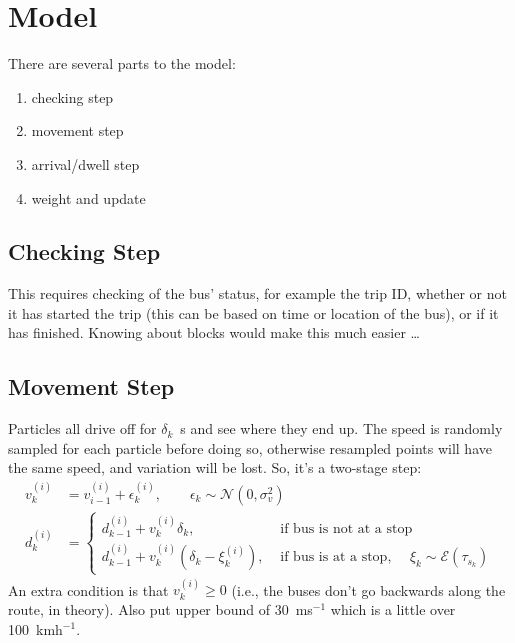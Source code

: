 \documentclass[10pt,a4paper]{article}
\begin{document}
\section{Model}

There are several parts to the model:

\begin{enumerate}
\item checking step
\item movement step
\item arrival/dwell step
\item weight and update
\end{enumerate}


\subsection{Checking Step}

This requires checking of the bus' status, for example the trip ID, whether or not it has started the trip
(this can be based on time or location of the bus), or if it has finished.
Knowing about blocks would make this much easier \ldots


\subsection{Movement Step}

Particles all drive off for $\delta_k$~s and see where they end up.
The speed is randomly sampled for each particle before doing so, otherwise resampled points will have the same speed,
and variation will be lost.
So, it's a two-stage step:
\begin{align*}
  v_k^{(i)} &= v_{i-1}^{(i)} + \epsilon_{k}^{(i)},\qquad \epsilon_k \sim \mathcal{N}(0, \sigma_v^2) \\
  d_k^{(i)} &=
              \begin{cases}
                d_{k-1}^{(i)} + v_k^{(i)} \delta_k, & \text{ if bus is not at a stop } \\
                d_{k-1}^{(i)} + v_k^{(i)} \left(\delta_k - \xi_k^{(i)}\right),
                &\text{ if bus is at a stop, } \quad \xi_k \sim \mathcal{E}(\tau_{s_k})
              \end{cases}
\end{align*}
An extra condition is that $v_k^{(i)} \geq 0$ (i.e., the buses don't go backwards along the route, in theory).
Also put upper bound of 30~ms$^{-1}$ which is a little over 100~kmh$^{-1}$.
\end{document}
